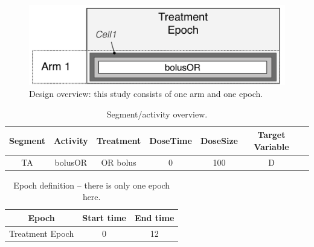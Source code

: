 \begin{figure}[ht!]
\centering
\includegraphics[width=0.7\linewidth]{pics/OneArmOneEpoch}
\caption{Design overview: this study consists of one arm and one epoch.}
\label{fig:designPatternBonate}
\end{figure}

\begin{table}[htdp!]
\begin{center}
\begin{tabular}{ccccccc}
\hline
Segment&Activity & Treatment & DoseTime & DoseSize & Target Variable \\
\hline
TA& bolusOR &  OR bolus & 0 & 100 & D \\
\hline
\end{tabular}
\end{center}
\caption{Segment/activity overview.}
\label{tab:segementActivity_Ribba}
\end{table}

\begin{table}[htdp!]
\begin{center}
\begin{tabular}{ccc}
\hline
Epoch & Start time & End time \\
\hline
Treatment Epoch & 0 &  12  \\
\hline
\end{tabular}
\end{center}
\caption{Epoch definition -- there is only one epoch here.}
\label{fig:Bonate:epochDef}
\end{table}

